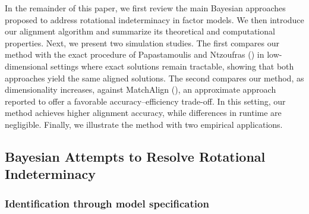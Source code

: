 \documentclass[
  man,
  longtable,
  nolmodern,
  notxfonts,
  notimes,
  colorlinks=true,linkcolor=blue,citecolor=blue,urlcolor=blue]{apa7}
\theoremstyle{plain}
\theoremstyle{plain}
\theoremstyle{remark}
\begin{document}
In the remainder of this paper, we first review the main Bayesian
approaches proposed to address rotational indeterminacy in factor
models. We then introduce our alignment algorithm and summarize its
theoretical and computational properties. Next, we present two
simulation studies. The first compares our method with the exact
procedure of Papastamoulis and Ntzoufras
() in
low-dimensional settings where exact solutions remain tractable, showing
that both approaches yield the same aligned solutions. The second
compares our method, as dimensionality increases, against MatchAlign
(), an approximate
approach reported to offer a favorable accuracy--efficiency trade-off.
In this setting, our method achieves higher alignment accuracy, while
differences in runtime are negligible. Finally, we illustrate the method
with two empirical applications.

\subsection{Bayesian Attempts to Resolve Rotational
Indeterminacy}\label{bayesian-attempts-to-resolve-rotational-indeterminacy}

\subsubsection{Identification through model
specification}\label{identification-through-model-specification}
\end{document}

